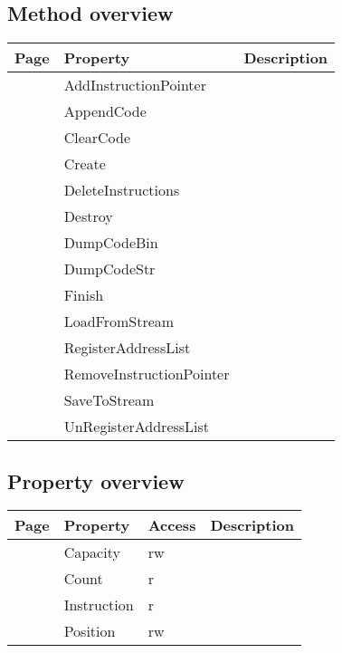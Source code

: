 \subsection{Method overview}
\label{thoriumcorepkg:thorium:tthoriuminstructions:methods}
\begin{tabularx}{\textwidth}{llX}
Page & Property & Description  \\ \hline
\pageref{thoriumcorepkg:thorium:tthoriuminstructions:addinstructionpointer} & AddInstructionPointer  &  \\
\pageref{thoriumcorepkg:thorium:tthoriuminstructions:appendcode} & AppendCode  &  \\
\pageref{thoriumcorepkg:thorium:tthoriuminstructions:clearcode} & ClearCode  &  \\
\pageref{thoriumcorepkg:thorium:tthoriuminstructions:create} & Create  &  \\
\pageref{thoriumcorepkg:thorium:tthoriuminstructions:deleteinstructions} & DeleteInstructions  &  \\
\pageref{thoriumcorepkg:thorium:tthoriuminstructions:destroy} & Destroy  &  \\
\pageref{thoriumcorepkg:thorium:tthoriuminstructions:dumpcodebin} & DumpCodeBin  &  \\
\pageref{thoriumcorepkg:thorium:tthoriuminstructions:dumpcodestr} & DumpCodeStr  &  \\
\pageref{thoriumcorepkg:thorium:tthoriuminstructions:finish} & Finish  &  \\
\pageref{thoriumcorepkg:thorium:tthoriuminstructions:loadfromstream} & LoadFromStream  &  \\
\pageref{thoriumcorepkg:thorium:tthoriuminstructions:registeraddresslist} & RegisterAddressList  &  \\
\pageref{thoriumcorepkg:thorium:tthoriuminstructions:removeinstructionpointer} & RemoveInstructionPointer  &  \\
\pageref{thoriumcorepkg:thorium:tthoriuminstructions:savetostream} & SaveToStream  &  \\
\pageref{thoriumcorepkg:thorium:tthoriuminstructions:unregisteraddresslist} & UnRegisterAddressList  &  \\
\hline
\end{tabularx}
\subsection{Property overview}
\label{thoriumcorepkg:thorium:tthoriuminstructions:properties}
\begin{tabularx}{\textwidth}{lllX}
Page & Property & Access & Description \\ \hline
\pageref{thoriumcorepkg:thorium:tthoriuminstructions:capacity} & Capacity & rw &  \\
\pageref{thoriumcorepkg:thorium:tthoriuminstructions:count} & Count & r &  \\
\pageref{thoriumcorepkg:thorium:tthoriuminstructions:instruction} & Instruction & r &  \\
\pageref{thoriumcorepkg:thorium:tthoriuminstructions:position} & Position & rw &  \\
\hline
\end{tabularx}
